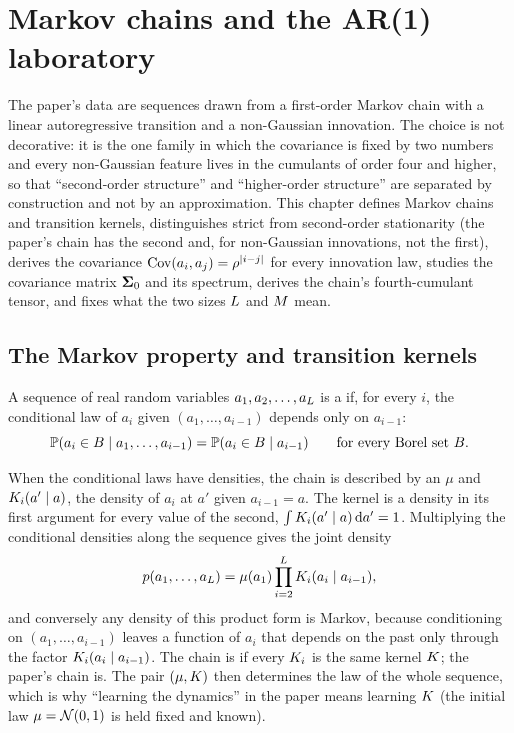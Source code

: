 \chapter{Markov chains and the AR(1) laboratory}
\label{ch:markov-chains}

The paper's data are sequences drawn from a first-order Markov chain with a linear
autoregressive transition and a non-Gaussian innovation. The choice is not
decorative: it is the one family in which the covariance is fixed by two numbers and
every non-Gaussian feature lives in the cumulants of order four and higher, so that
``second-order structure'' and ``higher-order structure'' are separated by
construction and not by an approximation. This chapter defines Markov chains and
transition kernels, distinguishes strict from second-order stationarity (the paper's
chain has the second and, for non-Gaussian innovations, not the first), derives the
covariance $\operatorname{Cov}(a_i,a_j)=\rho^{|i-j|}$ for every innovation law, studies the
covariance matrix $\mathbf{\Sigma}_0$ and its spectrum, derives the chain's fourth-cumulant tensor,
and fixes what the two sizes $L$ and $M$ mean.

\section{The Markov property and transition kernels}

\begin{definition}
A sequence of real random variables $a_1,a_2,\dots,a_{L}$ is a  if, for every $i$, the conditional law of $a_i$ given $(a_1,\dots,a_{i-1})$
depends only on $a_{i-1}$:
\begin{equation}
  \mathbb{P}(a_i\in B\mid a_1,\dots,a_{i-1})=\mathbb{P}(a_i\in B\mid a_{i-1})\qquad\text{for every Borel set }B.
\end{equation}
\end{definition}

When the conditional laws have densities, the chain is described by an
 $\mu$ and  $K_i(a'\mid a)$, the
density of $a_i$ at $a'$ given $a_{i-1}=a$. The kernel is a density in its first
argument for every value of the second, $\int K_i(a'\mid a)\,\mathrm{d} a'=1$. Multiplying
the conditional densities along the sequence gives the joint density
\begin{equation}
  p(a_1,\dots,a_{L})=\mu(a_1)\prod_{i=2}^{L}K_i(a_i\mid a_{i-1}),
  \label{eq:markov-joint}
\end{equation}
and conversely any density of this product form is Markov, because conditioning on
$(a_1,\dots,a_{i-1})$ leaves a function of $a_i$ that depends on the past only through
the factor $K_i(a_i\mid a_{i-1})$. The chain is  if every
$K_i$ is the same kernel $K$; the paper's chain is. The pair $(\mu,K)$
then determines the law of the whole sequence, which is why ``learning the
dynamics'' in the paper means learning $K$ (the initial law $\mu=\mathcal{N}\!\left(0,1\right)$ is
held fixed and known).

